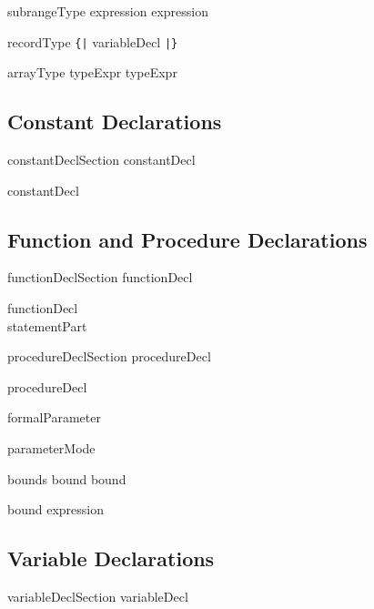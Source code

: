 \bgrm
subrangeType \Derive
  expression  expression
\egrm

\bgrm   
recordType \Derive
  \verb'{|' variableDecl  \verb'|}'
\egrm

\bgrm
arrayType \Derive
   typeExpr  typeExpr
\egrm

\subsection{Constant Declarations}
\bgrm                       
constantDeclSection \Derive
   constantDecl 
\egrm

\bgrm
constantDecl \Derive
   \trm{:}  
\egrm

\subsection{Function and Procedure Declarations}
\bgrm
functionDeclSection \Derive
   functionDecl 
\egrm

\bgrm
functionDecl \Derive
   \trm{(}  \trm{)} 
  \trm{:}  
  \\ \qquad {}   statementPart
\egrm

\bgrm
procedureDeclSection \Derive
   procedureDecl 
\egrm

\bgrm
procedureDecl \Derive
   \trm{(}  \trm{)} 
  \\ \qquad {}  
\egrm

\bgrm
formalParameter \Derive
    \trm{:} 
\egrm

\bgrm
parameterMode \Derive
\alt {}     
\alt {}   
\egrm

\bgrm
bounds \Derive
   bound \trm{;} bound
\egrm

\bgrm
bound \Derive
     expression
\alt \trm{\~{}}         
\egrm

\subsection{Variable Declarations}
\bgrm
variableDeclSection \Derive
   variableDecl 
\egrm

